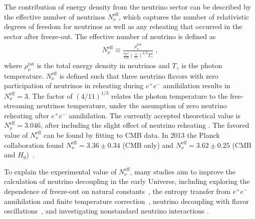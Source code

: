 The contribution of energy density from the neutrino sector can be described by the effective number of neutrinos $N_{\nu}^{\mathrm{eff}}$, which captures the number of relativistic degrees of freedom for neutrinos as well as any reheating that occurred in the sector after freeze-out. The effective number of neutrino is defined as 
\begin{align}\label{Neff}
N_\nu^{\mathrm{eff}}\equiv\frac{\rho^{\mathrm{tot}}_\nu}{\frac{7\pi^2}{120}\left(\frac{4}{11}\right)^{4/3}T_\gamma^4}\;,
\end{align}
where $\rho_\nu^{\mathrm{tot}}$ is the total energy density in neutrinos and $T_\gamma$ is the photon temperature. $N_\nu^{\mathrm{eff}}$ is defined such that three neutrino flavors with zero participation of neutrinos in reheating during $e^+e^-$ annihilation results in $N_\nu^{\mathrm{eff}}=3$. The factor of $\left(4/11\right)^{1/3}$ relates the photon temperature to the free-streaming neutrinos temperature, under the assumption of zero neutrino reheating after $e^+e^-$ annihilation. The currently accepted theoretical value is $N_\nu^{\mathrm{eff}}=3.046$, after including the slight effect of neutrino reheating \cite{Mangano:2005cc,Birrell:2014uka}. The favored value of $N_\nu^{\mathrm{eff}}$ can be found by fitting to CMB data. In 2013 the Planck collaboration found $N_\nu^{\mathrm{eff}}=3.36\pm0.34$ (CMB only) and $N_\nu^{\mathrm{eff}}= 3.62\pm0.25$ (CMB and $H_0$)~\cite{Planck:2013pxb}.

To explain the experimental value of $N_\nu^{\mathrm{eff}}$, many studies aim to improve the calculation of neutrino decoupling in the early Universe, including exploring the dependence of freeze-out on natural constants~\cite{Birrell:2014uka}, the entropy transfer from $e^+e^-$ annihilation and finite temperature correction~\cite{Dicus:1982bz,Heckler:1994tv,Fornengo:1997wa}, neutrino decoupling with flavor oscillations~\cite{Mangano:2001iu,Mangano:2005cc}, and investigating nonstandard neutrino interactions \cite{Morgan:1981zy,Fukugita:1987uy,Elmfors:1997tt,Vogel:1989iv,Mangano:2006ar,Giunti:2008ve,Mangano:2006ar}.%



